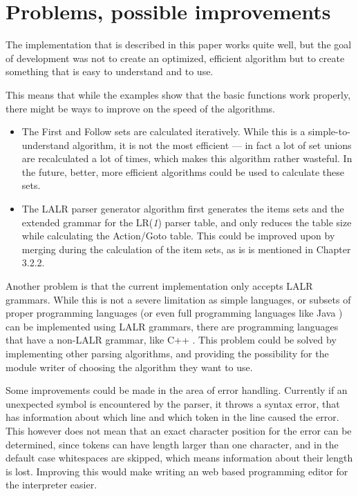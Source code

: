 \chapter{Problems, possible improvements}
The implementation that is described in this paper works quite well, but the goal of development was not to create an optimized, efficient algorithm but to create something that is easy to understand and to use.

This means that while the examples show that the basic functions work properly, there might be ways to improve on the speed of the algorithms.
\begin{itemize}
\item The First and Follow sets are calculated iteratively. While this is a simple-to-understand algorithm, it is not the most efficient --- in fact a lot of set unions are recalculated a lot of times, which makes this algorithm rather wasteful. In the future, better, more efficient algorithms \cite{deremer1982efficient} could be used to calculate these sets.
\item The LALR parser generator algorithm first generates the items sets and the extended grammar for the LR(\textit{1}) parser table, and only reduces the table size while calculating the Action/Goto table. This could be improved upon by merging during the calculation of the item sets, as is is mentioned in Chapter 3.2.2.
\end{itemize}

Another problem is that the current implementation only accepts LALR grammars. While this is not a severe limitation as simple languages, or subsets of proper programming languages (or even full programming languages like Java \cite{joy2000java}) can be implemented using LALR grammars, there are programming languages that have a non-LALR grammar, like C++ \cite{willink2001meta}. This problem could be solved by implementing other parsing algorithms, and providing the possibility for the module writer of choosing the algorithm they want to use.

Some improvements could be made in the area of error handling. Currently if an unexpected symbol is encountered by the parser, it throws a syntax error, that has information about which line and which token in the line caused the error. This however does not mean that an exact character position for the error can be determined, since tokens can have length larger than one character, and in the default case whitespaces are skipped, which means information about their length is lost. Improving this would make writing an web based programming editor for the interpreter easier.